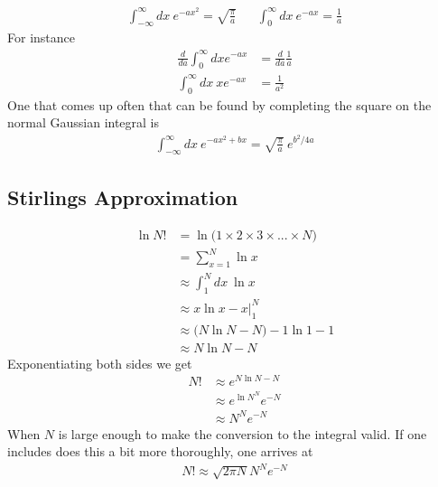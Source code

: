 \begin{align}
\int_{-\infty}^\infty dx ~e^{-ax^2} = \sqrt{\frac{\pi}{a}}
&&\int_0^\infty dx~e^{-a x} = \frac{1}{a}
\end{align}
For instance
\begin{align}
\frac{d}{da}\int_0^\infty dx e^{-a x} &= \frac{d}{da}\frac{1}{a}\\
\int_0^\infty dx~ x e^{-ax} &= \frac{1}{a^2}
\end{align}
One that comes up often that can be found by completing the square on the normal Gaussian integral is
\begin{align}
	\int_{-\infty}^\infty dx ~e^{-ax^2 + bx} = \sqrt{\frac{\pi}{a}}~e^{b^2/4a}
\end{align}


\subsection{Stirlings Approximation}\label{stirling}
\begin{align}
\ln N! &= \ln \Big(1\times 2\times 3\times...\times N\Big)\\
&= \sum_{x=1}^N \ln x\\
&\approx \int_1^N dx~\ln x\\
&\approx x\ln x - x\Big|_1^N\\
&\approx \Big(N\ln N- N \Big) - 1\ln 1 - 1\\
&\approx N\ln N - N
\end{align}
Exponentiating both sides we get
\begin{align}
N! &\approx e^{N\ln N - N}\\
&\approx e^{\ln N^N}e^{-N}\\
&\approx N^Ne^{-N}
\end{align}
When $N$ is large enough to make the conversion to the integral valid. If one includes does this a bit more thoroughly, one arrives at
\begin{align}
	N! \approx \sqrt{2\pi N} N^Ne^{-N}
\end{align}


